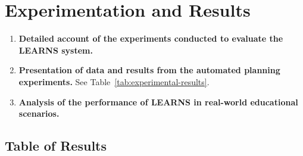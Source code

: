 \section{Experimentation and Results}
\begin{enumerate}
    \item \textbf{Detailed account of the experiments conducted to evaluate the LEARNS system.}
    \item \textbf{Presentation of data and results from the automated planning experiments.} See Table~\ref{tab:experimental-results}.
    \item \textbf{Analysis of the performance of LEARNS in real-world educational scenarios.}
\end{enumerate}

\subsection{Table of Results}


